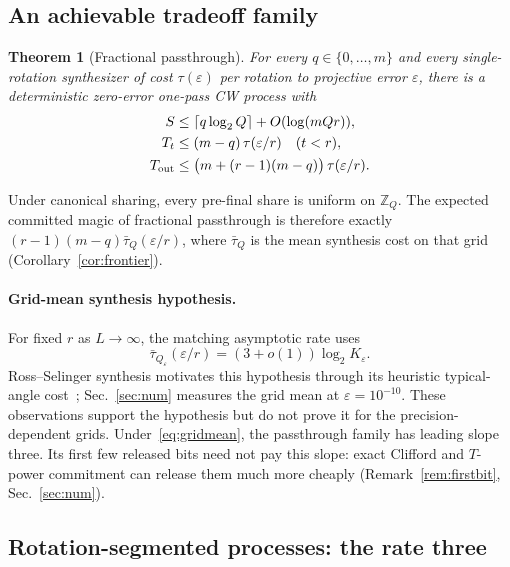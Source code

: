 \documentclass[aps,prx,twocolumn,superscriptaddress,nofootinbib,longbibliography]{revtex4-2}
\theoremstyle{plain}
\newtheorem{theorem}{Theorem}
\theoremstyle{definition}
\theoremstyle{remark}
\newcommand{\Tout}{T_{\mathrm{out}}}
\newcommand{\Z}{\mathbb{Z}}
\begin{document}
\subsection{An achievable tradeoff family}\label{sec:frontier}


\begin{theorem}[Fractional passthrough]\label{thm:frontier}
For every $q\in\{0,\dots,m\}$ and every single-rotation synthesizer of cost $\tau(\varepsilon)$ per rotation to projective error $\varepsilon$, there is a deterministic zero-error one-pass CW process with
\begin{align}
S&\le\lceil q\log_2Q\rceil+O(\log(mQr)),\notag\\
T_t&\le(m-q)\,\tau(\varepsilon/r)\quad(t<r),\notag\\
\Tout&\le\big(m+(r-1)(m-q)\big)\,\tau(\varepsilon/r).
\end{align}
\end{theorem}
Under canonical sharing, every pre-final share is uniform on $\Z_Q$. The expected committed magic of fractional passthrough is therefore exactly $(r-1)(m-q)\bar\tau_Q(\varepsilon/r)$, where $\bar\tau_Q$ is the mean synthesis cost on that grid (Corollary~\ref{cor:frontier}).

\paragraph{Grid-mean synthesis hypothesis.}\label{hyp:gridmean} For fixed $r$ as $L\to\infty$, the matching asymptotic rate uses
\begin{equation}\label{eq:gridmean}
\bar\tau_{Q_\varepsilon}(\varepsilon/r)=(3+o(1))\log_2K_\varepsilon.
\end{equation}
Ross--Selinger synthesis motivates this hypothesis through its heuristic typical-angle cost~\cite{RossSelinger}; Sec.~\ref{sec:num} measures the grid mean at $\varepsilon=10^{-10}$. These observations support the hypothesis but do not prove it for the precision-dependent grids. Under~\eqref{eq:gridmean}, the passthrough family has leading slope three. Its first few released bits need not pay this slope: exact Clifford and $T$-power commitment can release them much more cheaply (Remark~\ref{rem:firstbit}, Sec.~\ref{sec:num}).

\subsection{Rotation-segmented processes: the rate three}\label{sec:seg}
\end{document}

